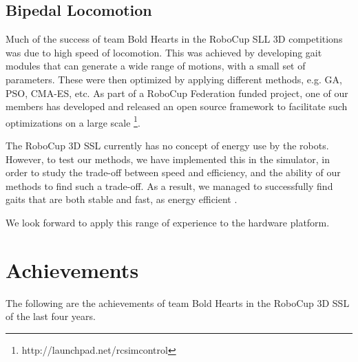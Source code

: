 \documentclass{llncs}
\begin{document}
\subsection{Bipedal Locomotion}
\label{sec:bipedal-locomotion}

Much of the success of team Bold Hearts in the RoboCup SLL 3D
competitions was due to high speed of locomotion. This was achieved by
developing gait modules that can generate a wide range of motions,
with a small set of parameters. These were then optimized by applying
different methods, e.g. GA, PSO, CMA-ES, etc. As part of a RoboCup
Federation funded project, one of our members has developed and
released an open source framework to facilitate such optimizations on
a large scale \footnote{http://launchpad.net/rcsimcontrol}.

The RoboCup 3D SSL currently has no concept of energy use by the
robots. However, to test our methods, we have implemented this in the
simulator, in order to study the trade-off between speed and
efficiency, and the ability of our methods to find such a
trade-off. As a result, we managed to successfully find gaits that are
both stable and fast, as energy efficient
\cite{lattarulo_application_2011}.

We look forward to apply this range of experience to the hardware
platform.

\section{Achievements}
\label{sec:achievements}

The following are the achievements of team Bold Hearts in the RoboCup 3D SSL of the last four years.
\end{document}
